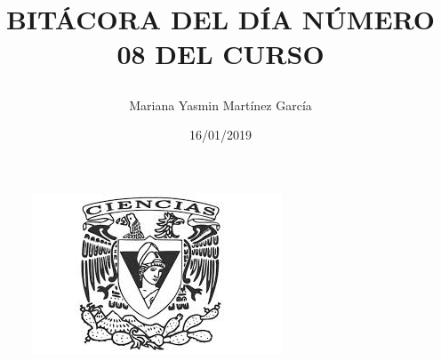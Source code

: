 \documentclass{article}
\title{\Huge\item\color{blue}\textbf{BITÁCORA DEL DÍA NÚMERO 08 DEL CURSO}}
\author{\Large Mariana Yasmin Martínez García}
\date{\Large 16/01/2019}
\begin{document}
\begin{figure}[t]
	\centering
	\includegraphics[width=0.7\linewidth]{Imagenes/1}
	\caption{}
	\label{fig:1}
\end{figure}

	\maketitle
		
	\newpage
	
\end{document}
